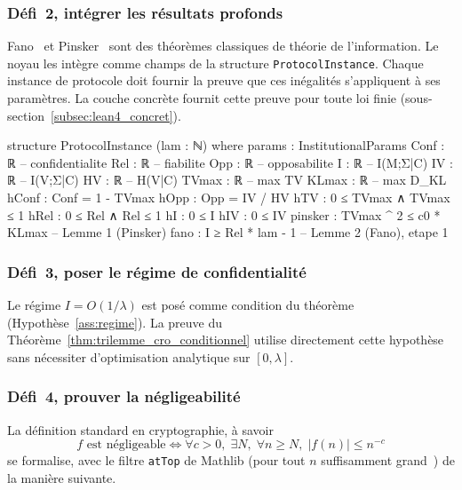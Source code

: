 \begin{sloppypar}
\subsubsection{D\'efi~2, int\'egrer les r\'esultats profonds}
\label{subsubsec:defi_axiomatiser}

Fano~\cite{Fano61} et Pinsker~\cite{Pinsker1964} sont des th\'eor\`emes
classiques de th\'eorie de l'information. Le noyau les int\`egre comme
champs de la structure \texttt{ProtocolInstance}. Chaque
instance de protocole doit fournir la preuve que ces in\'egalit\'es
s'appliquent \`a ses param\`etres. La couche concr\`ete fournit cette preuve pour
toute loi finie (sous-section~\ref{subsec:lean4_concret}).

\begin{leancode}[caption={Propri\'et\'es informationnelles comme champs de structure}, label={lst:lean4_protocol_instance}]
structure ProtocolInstance (lam : ℕ) where
  params : InstitutionalParams
  Conf   : ℝ   -- confidentialite
  Rel    : ℝ   -- fiabilite
  Opp    : ℝ   -- opposabilite
  I      : ℝ   -- I(M;Σ|C)
  IV     : ℝ   -- I(V;Σ|C)
  HV     : ℝ   -- H(V|C)
  TVmax  : ℝ   -- max TV
  KLmax  : ℝ   -- max D_KL
  hConf  : Conf = 1 - TVmax
  hOpp   : Opp = IV / HV
  hTV    : 0 ≤ TVmax ∧ TVmax ≤ 1
  hRel   : 0 ≤ Rel ∧ Rel ≤ 1
  hI     : 0 ≤ I
  hIV    : 0 ≤ IV
  pinsker : TVmax ^ 2 ≤ c0 * KLmax             -- Lemme 1 (Pinsker)
  fano    : I ≥ Rel * lam - 1                   -- Lemme 2 (Fano), etape 1
\end{leancode}

\subsubsection{D\'efi~3, poser le r\'egime de confidentialit\'e}
\label{subsubsec:defi_optimisation}

Le r\'egime $I = O(1/\lambda)$ est pos\'e comme condition du
th\'eor\`eme (Hypoth\`ese~\ref{ass:regime}). La preuve du
Th\'eor\`eme~\ref{thm:trilemme_cro_conditionnel}
utilise directement cette hypoth\`ese sans n\'ecessiter d'optimisation
analytique sur $[0, \lambda]$.

\subsubsection{D\'efi~4, prouver la n\'egligeabilit\'e}
\label{subsubsec:defi_negligeabilite}

La d\'efinition standard en
cryptographie, \`a savoir
\begin{equation}
f \text{ est n\'egligeable} \iff \forall c>0,\; \exists N,\; \forall n \ge N,\;
|f(n)| \le n^{-c}
\end{equation}
se formalise, avec le filtre \texttt{atTop} de Mathlib (\og pour tout $n$
suffisamment grand\fg~\cite{Mathlib,MathlibAnalysis}) de la mani\`ere suivante.


\end{sloppypar}
